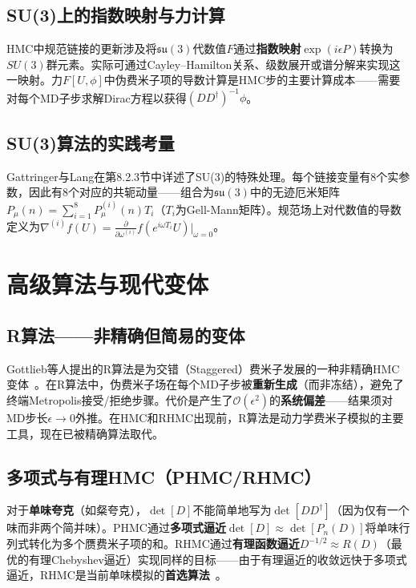 \documentclass[12pt,a4paper]{ctexart}
\theoremstyle{definition}
\begin{document}
\subsection{SU(3)上的指数映射与力计算}

HMC中规范链接的更新涉及将$\mathfrak{su}(3)$代数值$F$通过\textbf{指数映射}$\exp(i\epsilon P)$转换为$SU(3)$群元素。实际可通过Cayley--Hamilton关系、级数展开或谱分解来实现这一映射。力$F[U,\phi]$中伪费米子项的导数计算是HMC步的主要计算成本——需要对每个MD子步求解Dirac方程以获得$(DD^\dagger)^{-1} \phi$。

\subsection{SU(3)算法的实践考量}

Gattringer与Lang在第8.2.3节中详述了SU(3)的特殊处理。每个链接变量有8个实参数，因此有8个对应的共轭动量——组合为$\mathfrak{su}(3)$中的无迹厄米矩阵$P_\mu(n) = \sum_{i=1}^8 P_\mu^{(i)}(n) T_i$（$T_i$为Gell-Mann矩阵）。规范场上对代数值的导数定义为$\nabla^{(i)} f(U) = \frac{\partial}{\partial \omega^{(i)}} f(e^{i\omega T_i}U)|_{\omega=0}$。

\section{高级算法与现代变体}

\subsection{R算法——非精确但简易的变体}

Gottlieb等人提出的R算法是为交错（Staggered）费米子发展的一种非精确HMC变体~\cite{GattringerLang2010}。在R算法中，伪费米子场在每个MD子步被\textbf{重新生成}（而非冻结），避免了终端Metropolis接受/拒绝步骤。代价是产生了$\mathcal{O}(\epsilon^2)$的\textbf{系统偏差}——结果须对MD步长$\epsilon \to 0$外推。在HMC和RHMC出现前，R算法是动力学费米子模拟的主要工具，现在已被精确算法取代。

\subsection{多项式与有理HMC（PHMC/RHMC）}

对于\textbf{单味夸克}（如粲夸克），$\det[D]$不能简单地写为$\det[DD^\dagger]$（因为仅有一个味而非两个简并味）。PHMC通过\textbf{多项式逼近}$\det[D] \approx \det[P_n(D)]$将单味行列式转化为多个赝费米子项的和。RHMC通过\textbf{有理函数逼近}$D^{-1/2} \approx R(D)$（最优的有理Chebyshev逼近）实现同样的目标——由于有理逼近的收敛远快于多项式逼近，RHMC是当前单味模拟的\textbf{首选算法}~\cite{GattringerLang2010}。
\end{document}
